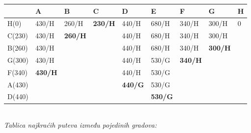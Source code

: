 \documentclass[12pt]{article}
\begin{document}
\begin{enumerate}
\begin{center}
\begin{tabular}{|l|llll|l|lll}
\hline
 & \multicolumn{1}{l|}{A} & \multicolumn{1}{l|}{B} & \multicolumn{1}{l|}{C} & D & E & \multicolumn{1}{l|}{F} & \multicolumn{1}{l|}{G} & \multicolumn{1}{l|}{H} \\ \hline
H(0) & \multicolumn{1}{l|}{430/H} & \multicolumn{1}{l|}{260/H} & \multicolumn{1}{l|}{\textbf{230/H}} & 440/H & 680/H & \multicolumn{1}{l|}{340/H} & \multicolumn{1}{l|}{300/H} & \multicolumn{1}{l|}{0} \\ \hline
C(230) & \multicolumn{1}{l|}{430/H} & \multicolumn{1}{l|}{\textbf{260/H}} & \multicolumn{1}{l|}{} & 440/H & 680/H & \multicolumn{1}{l|}{340/H} & \multicolumn{1}{l|}{300/H} & \textbf{} \\ \cline{1-3} \cline{5-8}
B(260) & \multicolumn{1}{l|}{430/H} &  & \multicolumn{1}{l|}{} & 440/H & 680/H & \multicolumn{1}{l|}{340/H} & \multicolumn{1}{l|}{\textbf{300/H}} &  \\ \cline{1-2} \cline{5-8}
G(300) & \multicolumn{1}{l|}{430/H} &  & \multicolumn{1}{l|}{} & 440/H & 530/G & \multicolumn{1}{l|}{\textbf{340/H}} &  &  \\ \cline{1-2} \cline{5-7}
F(340) & \multicolumn{1}{l|}{\textbf{430/H}} &  & \multicolumn{1}{l|}{} & 440/H & 530/G & \textbf{} & \textbf{} &  \\ \cline{1-2} \cline{5-6}
A(430) &  &  & \multicolumn{1}{l|}{\textbf{}} & \textbf{440/G} & 530/G &  &  &  \\ \cline{1-1} \cline{5-6}
D(440) & \textbf{} & \textbf{} &  &  & \textbf{530/G} & \textbf{} &  &  \\ \cline{1-1} \cline{6-6}
\end{tabular}
\\
      \vspace{1cm}
      \textit{Tablica najkraćih puteva između pojedinih gradova:\\}
\end{center}
\end{enumerate}
\end{document}
